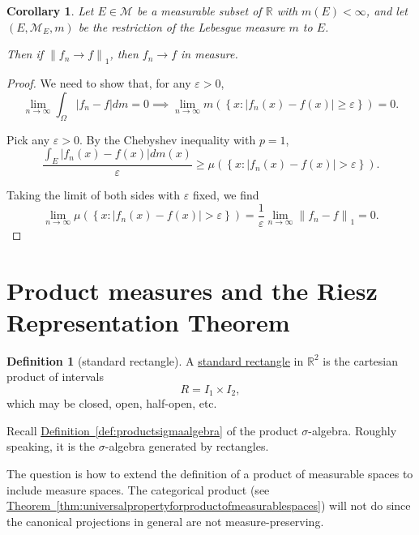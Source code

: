 \documentclass[a4paper]{scrartcl}
\newcommand{\R}{\mathbb{R}}
\newcommand{\defn}[1]{\ul{#1}}
\newcommand{\norm}[1]{\left\|#1\right\|}
\newcommand{\abs}[1]{\left|#1\right|}
\theoremstyle{definition}
\newtheorem{definition}{Definition}[section]
\theoremstyle{plain}
\newtheorem{corollary}{Corollary}[section]
\theoremstyle{remark}
\begin{document}
\begin{corollary}
  Let $E \in \mathcal{M}$ be a measurable subset of $\R$ with $m(E) < \infty$, and let $(E, \mathcal{M}_{E}, m)$ be the restriction of the Lebesgue measure $m$ to $E$.

  Then if $\norm{f_{n} \to f}_{1}$, then $f_{n} \to f$ in measure.
\end{corollary}
\begin{proof}
  We need to show that, for any $\varepsilon > 0$,
  \begin{equation*}
    \lim_{n \to \infty} \int_{\Omega} \abs{f_{n} - f} dm = 0 \implies \lim_{n \to \infty} m\left( \left\{ x\colon \abs{f_{n}(x) - f(x)} \geq \varepsilon \right\} \right) = 0.
  \end{equation*}

  Pick any $\varepsilon > 0$. By the Chebyshev inequality with $p=1$,
  \begin{equation*}
    \frac{\int_{E} \abs{f_{n}(x) - f(x)} dm(x)}{\varepsilon} \geq \mu\left( \left\{ x\colon \abs{f_{n}(x) - f(x)} > \varepsilon \right\} \right).
  \end{equation*}

  Taking the limit of both sides with $\varepsilon$ fixed, we find
  \begin{equation*}
    \lim_{n \to \infty} \mu\left( \left\{ x\colon \abs{f_{n}(x) - f(x)} > \varepsilon \right\} \right) = \frac{1}{\varepsilon} \lim_{n \to \infty} \norm{f_{n} - f}_{1} = 0.
  \end{equation*}
\end{proof}

\section{Product measures and the Riesz Representation Theorem}
\begin{definition}[standard rectangle]
  \label{def:standardrectangle}
  A \defn{standard rectangle} in $\R^{2}$ is the cartesian product of intervals
  \begin{equation*}
    R = I_{1} \times I_{2},
  \end{equation*}
  which may be closed, open, half-open, etc.
\end{definition}

Recall \hyperref[def:productsigmaalgebra]{Definition~\ref*{def:productsigmaalgebra}} of the product $\sigma$-algebra. Roughly speaking, it is the $\sigma$-algebra generated by rectangles.

The question is how to extend the definition of a product of measurable spaces to include measure spaces. The categorical product (see \hyperref[thm:universalpropertyforproductofmeasurablespaces]{Theorem~\ref*{thm:universalpropertyforproductofmeasurablespaces}}) will not do since the canonical projections in general are not measure-preserving.
\end{document}
